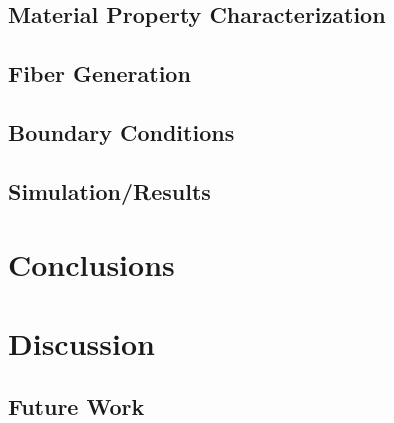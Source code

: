 \documentclass[12pt]{article}
\begin{document}
\subsection{Material Property Characterization}
\label{Material Property Characterization}

\subsection{Fiber Generation}
\label{Simulation}

\subsection{Boundary Conditions}
\label{Boundary Conditions}

\subsection{Simulation/Results}
\label{Simulation/Results}

\newpage
\section{Conclusions}
\label{Conclusions}

\newpage
\section{Discussion}
\label{Discussion}
\subsection{Future Work}
\label{Future Work}
\end{document}
